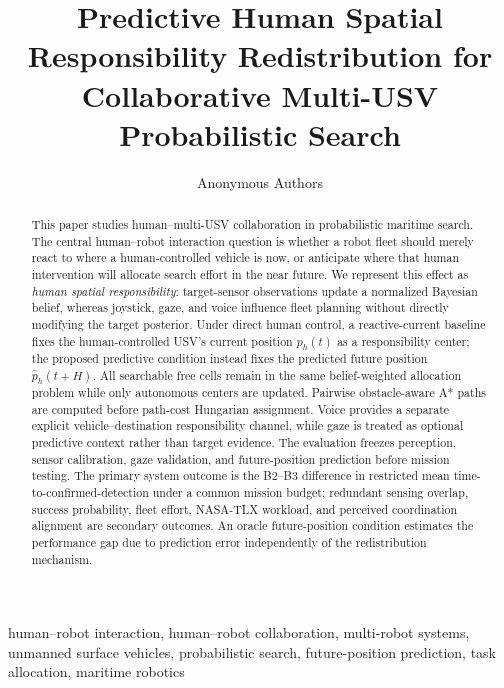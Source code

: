 \documentclass[conference]{IEEEtran}
\begin{document}
\title{Predictive Human Spatial Responsibility Redistribution for\\
Collaborative Multi-USV Probabilistic Search}

\author{Anonymous Authors}

\maketitle

\begin{abstract}
This paper studies human--multi-USV collaboration in probabilistic maritime
search. The central human--robot interaction question is whether a robot fleet
should merely react to where a human-controlled vehicle is now, or anticipate
where that human intervention will allocate search effort in the near future.
We represent this effect as \emph{human spatial responsibility}: target-sensor
observations update a normalized Bayesian belief, whereas joystick, gaze, and
voice influence fleet planning without directly modifying the target
posterior. Under direct human control, a reactive-current baseline fixes the
human-controlled USV's current position $p_h(t)$ as a responsibility center;
the proposed predictive condition instead fixes the predicted future position
$\hat p_h(t+H)$. All searchable free cells remain in the same belief-weighted
allocation problem while only autonomous centers are updated. Pairwise
obstacle-aware A* paths are computed before path-cost Hungarian assignment.
Voice provides a separate explicit vehicle--destination responsibility channel,
while gaze is treated as optional predictive context rather than target
evidence. The evaluation freezes perception, sensor calibration, gaze
validation, and future-position prediction before mission testing. The primary
system outcome is the B2--B3 difference in restricted mean
time-to-confirmed-detection under a common mission budget; redundant sensing
overlap, success probability, fleet effort, NASA-TLX workload, and perceived
coordination alignment are secondary outcomes. An oracle future-position
condition estimates the performance gap due to prediction error independently
of the redistribution mechanism.
\end{abstract}

\begin{IEEEkeywords}
human--robot interaction, human--robot collaboration, multi-robot systems,
unmanned surface vehicles, probabilistic search, future-position prediction,
task allocation, maritime robotics
\end{IEEEkeywords}
\end{document}
